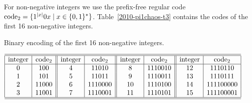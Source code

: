 \documentclass[
aip,
cha,
amssymb
]{revtex4-1}
\begin{document}
%
%
%

For non-negative integers we use the prefix-free regular code  ${\rm code}_{2}
= \{1^{|x|}0x \mid x\in\{0,1\}^{*}\}$. Table~\ref{2010-pi1chaos-t3} contains  the codes of
the first 16 non-negative integers.
\begin{table}
\caption{Binary encoding of the first 16 non-negative integers.}
\begin{center}
$\begin{array}{|c|c||c|c||c|c||c|c|}
\hline\hline
{\rm integer} & {\rm code}_{2} & {\rm integer} & {\rm code}_{2}  & {\rm integer} & {\rm code}_{2}  & {\rm integer} & {\rm code}_{2}\\\hline
0 & 100 & 4 & 11010 & 8 &  1110010& 12 & 1110110\\
1 & 101 & 5 & 11011& 9 &  1110011& 13 & 1110111\\
2 & 11000 & 6 & 1110000 & 10 & 1110100 & 14 & 111100000\\
3 & 11001 & 7 & 1110001 & 11 &  1110101& 15 & 111100001
\\\hline\hline\end{array}$
\end{center}
\label{2010-pi1chaos-t3}
\end{table}
\end{document}
